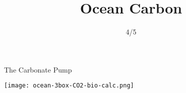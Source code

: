 

\title{Ocean Carbon}
\author{4/5}



\begin{frame}{The Carbonate Pump}
    
    \texttt{[image: ocean-3box-CO2-bio-calc.png]}
        
\end{frame}




